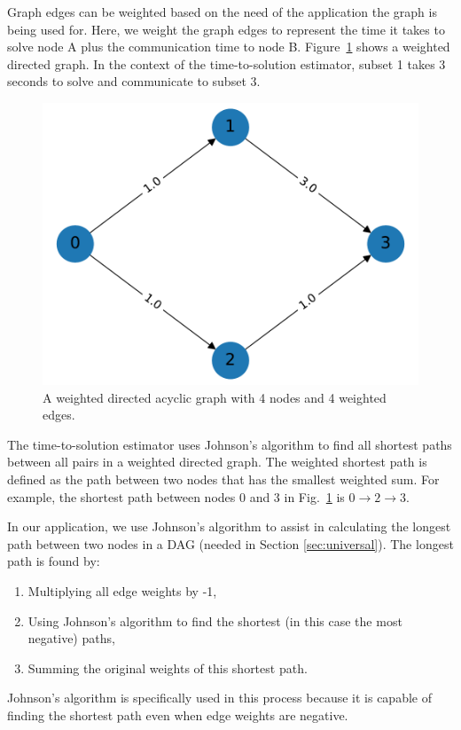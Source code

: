 \documentclass[times,final]{elsarticle}
\begin{document}
Graph edges can be weighted based on the need of the application the graph is being used for. Here, we weight the graph edges to represent the time it takes to solve node A plus the communication time to node B.
Figure~\ref{weighted_directed_graph} shows a weighted directed graph.
In the context of the time-to-solution estimator, subset 1 takes 3 seconds to solve and communicate to subset 3.
\begin{figure}[H]
\centering
\includegraphics[scale=0.5]{../figures/weighted_directed_graph.pdf}
\caption{A weighted directed acyclic graph with 4 nodes and 4 weighted edges.}
\label{weighted_directed_graph}
\end{figure}

The time-to-solution estimator uses Johnson's algorithm \cite{intro_to_alg,johnson_nist,johnson_johnson} to find all shortest paths between all pairs in a weighted directed graph.
The weighted shortest path is defined as the path between two nodes that has the smallest weighted sum.
For example, the shortest path between nodes 0 and 3 in Fig.~\ref{weighted_directed_graph} is $0\rightarrow 2\rightarrow 3$.

In our application, we use Johnson's algorithm to assist in calculating the longest path between two nodes in a DAG (needed in Section \ref{sec:universal}).
The longest path is found by:
\begin{enumerate}
  \item Multiplying all edge weights by -1,
  \item Using Johnson's algorithm to find the shortest (in this case the most negative) paths,
  \item Summing the original weights of this shortest path.
\end{enumerate}
Johnson's algorithm is specifically used in this process because it is capable of finding the shortest path even when edge weights are negative.
\end{document}
